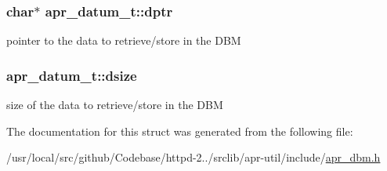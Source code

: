 \subsubsection[{\texorpdfstring{dptr}{dptr}}]{\setlength{\rightskip}{0pt plus 5cm}char$\ast$ apr\+\_\+datum\+\_\+t\+::dptr}\hypertarget{structapr__datum__t_a7f4e0997f26d818c5674446ebb3d58bb}{}\label{structapr__datum__t_a7f4e0997f26d818c5674446ebb3d58bb}
pointer to the \textquotesingle{}data\textquotesingle{} to retrieve/store in the D\+BM 
\subsubsection[{\texorpdfstring{dsize}{dsize}}]{ apr\+\_\+datum\+\_\+t\+::dsize}\hypertarget{structapr__datum__t_a5b58c23a5f65a8a6e3f8228fef5e429c}{}\label{structapr__datum__t_a5b58c23a5f65a8a6e3f8228fef5e429c}
size of the \textquotesingle{}data\textquotesingle{} to retrieve/store in the D\+BM 

The documentation for this struct was generated from the following file\+:\begin{DoxyCompactItemize}
\item 
/usr/local/src/github/\+Codebase/httpd-\/2../srclib/apr-\/util/include/\hyperlink{apr__dbm_8h}{apr\+\_\+dbm.\+h}\end{DoxyCompactItemize}
